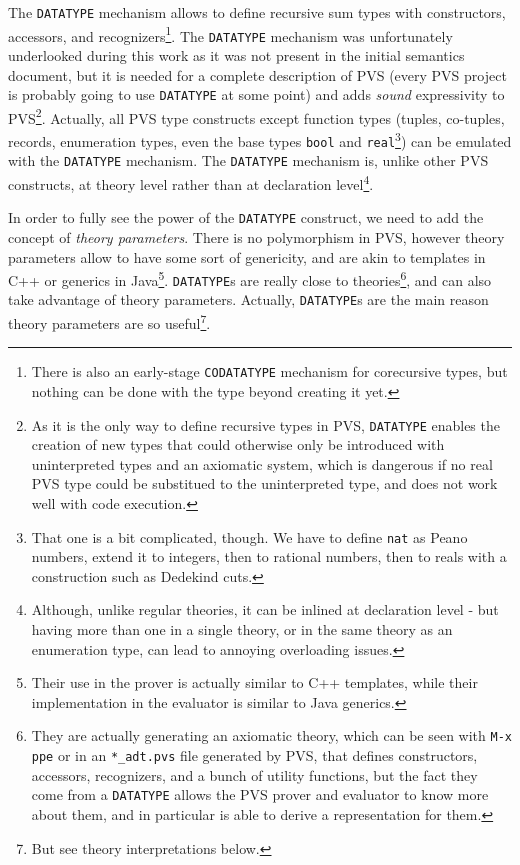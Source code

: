 \documentclass[utf8,a4paper]{article}
\begin{document}
The \verb!DATATYPE! mechanism allows to define recursive sum types
with constructors, accessors, and recognizers\footnote{There is also
  an early-stage \verb!CODATATYPE! mechanism for corecursive types,
  but nothing can be done with the type beyond creating it yet.}. The
\verb!DATATYPE! mechanism was unfortunately underlooked during this
work as it was not present in the initial semantics document, but it
is needed for a complete description of PVS (every PVS project is
probably going to use \verb!DATATYPE! at some point) and adds
\textit{sound} expressivity to PVS\footnote{As it is the only way to
  define recursive types in PVS, \verb!DATATYPE! enables the creation
  of new types that could otherwise only be introduced with
  uninterpreted types and an axiomatic system, which is dangerous if
  no real PVS type could be substitued to the uninterpreted type, and
  does not work well with code execution.}. Actually, all PVS type
constructs except function types (tuples, co-tuples, records,
enumeration types, even the base types \verb!bool! and
\verb!real!\footnote{That one is a bit complicated, though. We have to
  define \verb!nat! as Peano numbers, extend it to integers, then to
  rational numbers, then to reals with a construction such as Dedekind
  cuts.}) can be emulated with the \verb!DATATYPE! mechanism. The
\verb!DATATYPE! mechanism is, unlike other PVS constructs, at theory
level rather than at declaration level\footnote{Although, unlike
  regular theories, it can be inlined at declaration level - but
  having more than one in a single theory, or in the same theory as an
  enumeration type, can lead to annoying overloading issues.}.

In order to fully see the power of the \verb!DATATYPE! construct, we
need to add the concept of \textit{theory parameters}. There is no
polymorphism in PVS, however theory parameters allow to have some sort
of genericity, and are akin to templates in C++ or generics in
Java\footnote{Their use in the prover is actually similar to C++
  templates, while their implementation in the evaluator is similar to
  Java generics.}. \verb!DATATYPE!s are really close to
theories\footnote{They are actually generating an axiomatic theory,
  which can be seen with \verb!M-x ppe! or in an \verb!*_adt.pvs! file
  generated by PVS, that defines constructors, accessors, recognizers,
  and a bunch of utility functions, but the fact they come from a
  \verb!DATATYPE! allows the PVS prover and evaluator to know more
  about them, and in particular is able to derive a representation for
  them.}, and can also take advantage of theory parameters. Actually,
\verb!DATATYPE!s are the main reason theory parameters are so
useful\footnote{But see theory interpretations below.}.
\end{document}
